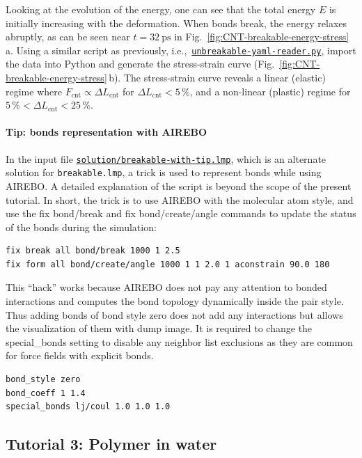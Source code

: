 \documentclass[9pt,tutorial]{livecoms}
\newcommand{\lmpcmd}[1]{\colorbox{listing}{\textcolor{command}{\small{#1}}}} %
\newcommand{\flecmd}[1]{\textcolor{command}{\texttt{#1}}} %
\newcommand{\dwlcmd}[1]{\textcolor{download}{\texttt{#1}}} %
\newcommand{\filepath}{https://raw.githubusercontent.com/lammpstutorials/lammpstutorials-article/main/files/}
\begin{document}
Looking at the evolution of the energy, one can see that the total
energy $E$ is initially increasing with the deformation.  When bonds
break, the energy relaxes abruptly, as can be seen near $t=32~\text{ps}$
in Fig.~\ref{fig:CNT-breakable-energy-stress}\,a.  Using a similar
script as previously,
i.e.,~\href{\filepath tutorial2/unbreakable-yaml-reader.py}{\dwlcmd{unbreakable-yaml-reader.py}},
import the data into Python and generate the stress-strain curve
(Fig.~\ref{fig:CNT-breakable-energy-stress}\,b).  The stress-strain
curve reveals a linear (elastic) regime where
$F_\text{cnt} \propto \Delta L_\text{cnt}$ for
$\Delta L_\text{cnt} < 5\,\%$, and a non-linear (plastic) regime for
$5\,\% < \Delta L_\text{cnt} < 25\,\%$.

\paragraph{Tip: bonds representation with AIREBO}
\label{tip-dynamic-bonds}

In the input file
\href{\filepath tutorial2/solution/breakable-with-tip.lmp}{\dwlcmd{solution/breakable-with-tip.lmp}},
which is an alternate solution for \flecmd{breakable.lmp}, a trick is
used to represent bonds while using AIREBO.  A detailed explanation of
the script is beyond the scope of the present tutorial.  In short, the
trick is to use AIREBO with the \lmpcmd{molecular} atom style, and use
the \lmpcmd{fix bond/break} and \lmpcmd{fix bond/create/angle} commands
to update the status of the bonds during the simulation:
\begin{lstlisting}
fix break all bond/break 1000 1 2.5
fix form all bond/create/angle 1000 1 1 2.0 1 aconstrain 90.0 180
\end{lstlisting}
This ``hack'' works because AIREBO does not pay any attention to bonded
interactions and computes the bond topology dynamically inside the pair
style.  Thus adding bonds of bond style \lmpcmd{zero} does not add any
interactions but allows the visualization of them with \lmpcmd{dump
  image}.  It is required to change the \lmpcmd{special\_bonds}
setting to disable any neighbor list exclusions as they are common for
force fields with explicit bonds.
\begin{lstlisting}
bond_style zero
bond_coeff 1 1.4
special_bonds lj/coul 1.0 1.0 1.0
\end{lstlisting}

\subsection{Tutorial 3: Polymer in water}
\label{all-atom-label}
\end{document}
